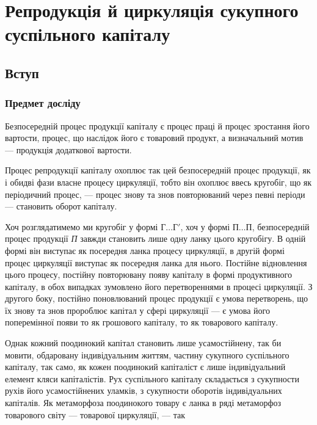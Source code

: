 
\chapter{Репродукція й циркуляція сукупного
суспільного капіталу}

\section{Вступ}\footnotemark{}%

\subsection{Предмет досліду}

Безпосередній процес продукції капіталу є процес праці й процес
зростання його вартости, процес, що наслідок його є товаровий продукт,
а визначальний мотив — продукція додаткової вартости.

Процес репродукції капіталу охоплює так цей безпосередній процес
продукції, як і обидві фази власне процесу циркуляції, тобто він охоплює
ввесь кругобіг, що як періодичний процес, — процес знову та знов
повторюваний через певні періоди — становить оборот капіталу.

Хоч розглядатимемо ми кругобіг у формі $Г\dots{} Г'$, хоч у формі $П\dots{} П$,
безпосередній процес продукції \emph{П} завжди становить лише одну ланку
цього кругобігу. В одній формі він виступає як посередня ланка процесу
циркуляції, в другій формі процес циркуляції виступає як посередня
ланка для нього. Постійне відновлення цього процесу, постійну повторювану
появу капіталу в формі продуктивного капіталу, в обох випадках
зумовлено його перетвореннями в процесі циркуляції. З другого боку,
постійно поновлюваний процес продукції є умова перетворень, що їх
знову та знов пророблює капітал у сфері циркуляції — є умова його
поперемінної появи то як грошового капіталу, то як товарового
капіталу.

Однак кожний поодинокий капітал становить лише усамостійнену, так
би мовити, обдаровану індивідуальним життям, частину сукупного суспільного
капіталу, так само, як кожен поодинокий капіталіст є лише індивідуальний
елемент кляси капіталістів. Рух суспільного капіталу складається
з сукупности рухів його усамостійнених уламків, з сукупности оборотів
індивідуальних капіталів. Як метаморфоза поодинокого товару є ланка
в ряді метаморфоз товарового світу — товарової циркуляції, — так
\parbreak{}  %
